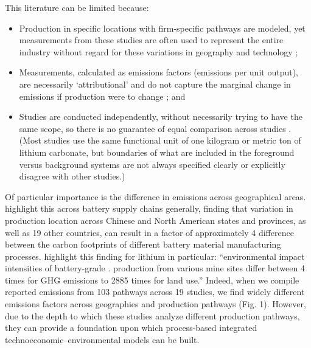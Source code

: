 This literature can be limited because:
\begin{itemize}
    \item Production in specific locations with firm-specific pathways are modeled, yet measurements from these studies are often used to represent the entire industry without regard for these variations in geography and technology \cite{sunRobustAssessmentsLithium2025, kallitsisThinkGlobalAct2024};
    
    \item Measurements, calculated as emissions factors (emissions per unit output), are necessarily `attributional' and do not capture the marginal change in emissions if production were to change \cite{nationalacademiesofscienceengineeringandmedicineAssessmentTechnologiesImproving2021}; and

    \item Studies are conducted independently, without necessarily trying to have the same scope, so there is no guarantee of equal comparison across studies \cite{bergersonLifeCycleAssessment2020}. (Most studies use the same functional unit of one kilogram or metric ton of lithium carbonate, but boundaries of what are included in the foreground versus background systems are not always specified clearly or explicitly disagree with other studies.)
\end{itemize}

Of particular importance is the difference in emissions across geographical areas. \citet{kallitsisThinkGlobalAct2024} highlight this across battery supply chains generally, finding that variation in production location across Chinese and North American states and provinces, as well as 19 other countries, can result in a factor of approximately 4 difference between the carbon footprints of different battery material manufacturing processes. \citet{sunRobustAssessmentsLithium2025} highlight this finding for lithium in particular: ``environmental impact intensities of battery-grade . production from various mine sites differ between 4 times for GHG emissions to 2885 times for land use.'' Indeed, when we compile reported emissions from 103 pathways across 19 studies, we find widely different emissions factors across geographies and production pathways (Fig. 1). However, due to the depth to which these studies analyze different production pathways, they can provide a foundation upon which process-based integrated technoeconomic--environmental models can be built.

